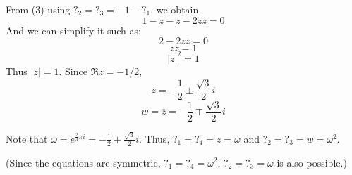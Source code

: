 From (3) using \(?_2 = ?_3 = -1-?_1\), we obtain
\[1 - z - \overline{z} - 2 z \overline{z} = 0\]
And we can simplify it such as:
\[2 - 2 z \overline{z} = 0\]
\[z \overline{z} = 1\]
\[|z|^2 = 1\]
Thus \(|z| = 1\). Since \(\Re z = -1/2\),
\[z = -\frac{1}{2} \pm \frac{\sqrt{3}}{2}i\]
\[w = \overline{z} = -\frac{1}{2} \mp \frac{\sqrt{3}}{2}i\]

Note that \(\omega = e^{\frac{2}{3} \pi i} = -\frac{1}{2} + \frac{\sqrt{3}}{2}i\).
Thus, \(?_1 = ?_4 = z = \omega\) and \(?_2 = ?_3 = w = \omega^2\).
\qedsq

(Since the equations are symmetric,
\(?_1 = ?_4 = \omega^2\), \(?_2 = ?_3 = \omega\)
is also possible.)
